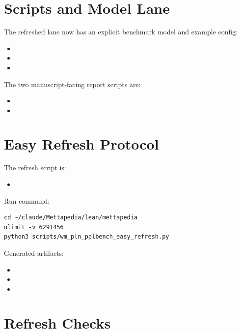 \documentclass[11pt,openany]{report}
\begin{document}
\section{Scripts and Model Lane}

The refreshed lane now has an explicit benchmark model and example config:
\begin{itemize}
\item {}
\item {}
\item {}
\end{itemize}

The two manuscript-facing report scripts are:
\begin{itemize}
\item {}
\item {}
\end{itemize}

\section{Easy Refresh Protocol}

The refresh script is:
\begin{itemize}
\item {}
\end{itemize}

Run command:
\begin{lstlisting}
cd ~/claude/Mettapedia/lean/mettapedia
ulimit -v 6291456
python3 scripts/wm_pln_pplbench_easy_refresh.py
\end{lstlisting}

Generated artifacts:
\begin{itemize}
\item {}
\item {}
\item {}
\end{itemize}

\section{Refresh Checks}
\end{document}
